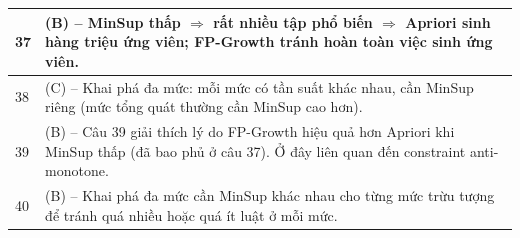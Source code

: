 \documentclass[10pt]{article}
\begin{document}
\begin{singlespace}
\begin{longtable}{|p{}|p{}|}
\hline
37 & (B) -- MinSup thấp $\Rightarrow$ rất nhiều tập phổ biến $\Rightarrow$ Apriori sinh hàng triệu ứng viên; FP-Growth tránh hoàn toàn việc sinh ứng viên. \\
\hline
38 & (C) -- Khai phá đa mức: mỗi mức có tần suất khác nhau, cần MinSup riêng (mức tổng quát thường cần MinSup cao hơn). \\
\hline
39 & (B) -- Câu 39 giải thích lý do FP-Growth hiệu quả hơn Apriori khi MinSup thấp (đã bao phủ ở câu 37). Ở đây liên quan đến constraint anti-monotone. \\
\hline
40 & (B) -- Khai phá đa mức cần MinSup khác nhau cho từng mức trừu tượng để tránh quá nhiều hoặc quá ít luật ở mỗi mức. \\
\hline
\end{longtable}
\end{singlespace}
\end{document}
